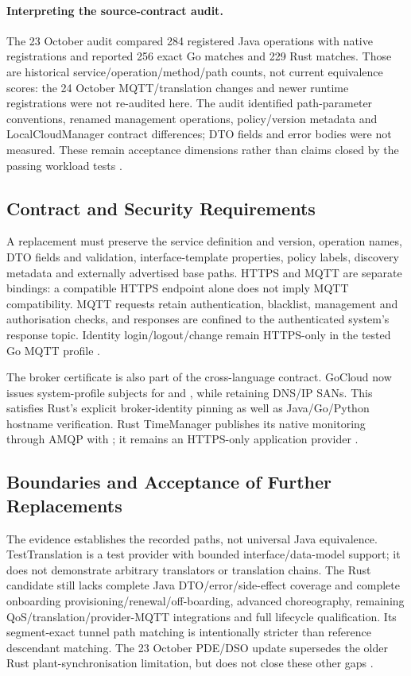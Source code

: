 \documentclass[a4paper]{arrowhead}
\begin{document}
\paragraph{Interpreting the source-contract audit.}
The 23 October audit compared 284 registered Java operations with native
registrations and reported 256 exact Go matches and 229 Rust matches. Those are
historical service/operation/method/path counts, not current equivalence scores:
the 24 October MQTT/translation changes and newer runtime registrations were not
re-audited here. The audit identified path-parameter conventions, renamed management
operations, policy/version metadata and LocalCloudManager contract differences;
DTO fields and error bodies were not measured. These remain acceptance dimensions
rather than claims closed by the passing workload tests
\cite{contractAudit20261023}.

\subsection{Contract and Security Requirements}
A replacement must preserve the service definition and version, operation names,
DTO fields and validation, interface-template properties, policy labels, discovery
metadata and externally advertised base paths. HTTPS and MQTT are separate
bindings: a compatible HTTPS endpoint alone does not imply MQTT compatibility.
MQTT requests retain authentication, blacklist, management and authorisation
checks, and responses are confined to the authenticated system's response topic.
Identity login/logout/change remain HTTPS-only in the tested Go MQTT profile
\cite{goMqtt20261024}.

The broker certificate is also part of the cross-language contract. GoCloud now
issues system-profile subjects for 
and , while retaining DNS/IP SANs.
This satisfies Rust's explicit broker-identity pinning as well as Java/Go/Python
hostname verification. Rust TimeManager publishes its native monitoring through
AMQP with ; it remains an HTTPS-only
application provider \cite{goMqtt20261024}.

\subsection{Boundaries and Acceptance of Further Replacements}
The evidence establishes the recorded paths, not universal Java equivalence.
TestTranslation is a test provider with bounded interface/data-model support;
it does not demonstrate arbitrary translators or translation chains. The Rust
candidate still lacks complete Java DTO/error/side-effect coverage and complete
onboarding provisioning/renewal/off-boarding, advanced choreography, remaining
QoS/translation/provider-MQTT integrations and full lifecycle qualification.
Its segment-exact tunnel path matching is intentionally stricter than reference
descendant matching. The 23 October PDE/DSO update supersedes the older Rust
plant-synchronisation limitation, but does not close these other gaps
\cite{goMqtt20261024,rustFederation20261019,nativePde20261023}.
\end{document}

